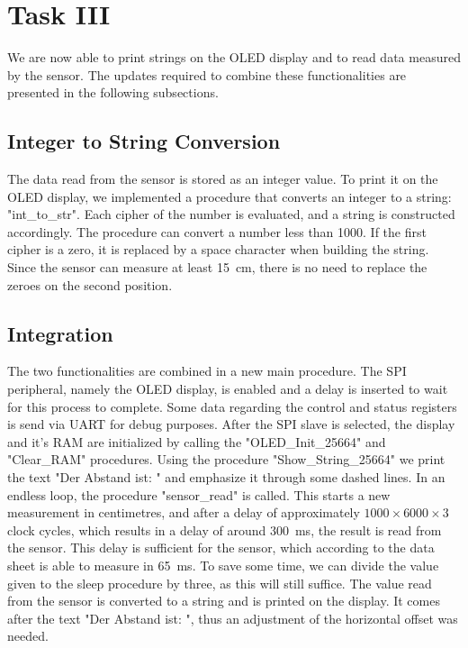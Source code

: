 	\section{Task III} %
	\label{sec:impl_task_3}
		We are now able to print strings on the OLED display and to read data measured by the sensor. The updates required to combine these functionalities are presented in the following subsections.
		
		\subsection{Integer to String Conversion} %
		\label{sub:integer_to_string_conversion}
			The data read from the sensor is stored as an integer value. To print it on the OLED display, we implemented a procedure that converts an integer to a string: "int\_to\_str". Each cipher of the number is evaluated, and a string is constructed accordingly. The procedure can convert a number less than 1000. If the first cipher is a zero, it is replaced by a space character when building the string. Since the sensor can measure at least \SI{15}{\centi\meter}, there is no need to replace the zeroes on the second position.  

		\subsection{Integration} %
		\label{sub:integration}
			The two functionalities are combined in a new main procedure. The SPI peripheral, namely the OLED display, is enabled and a delay is inserted to wait for this process to complete. Some data regarding the control and status registers is send via UART for debug purposes. After the SPI slave is selected, the display and it’s RAM are initialized by calling the "OLED\_Init\_25664" and "Clear\_RAM" procedures. Using the procedure "Show\_String\_25664" we print the text "Der Abstand ist: " and emphasize it through some dashed lines. 
			In an endless loop, the procedure "sensor\_read" is called. This starts a new measurement in centimetres, and after a delay of approximately 
			\begin{math} 
				1000 \times 6000 \times 3 
			\end{math} 
			clock cycles, which results in a delay of around \SI{300}{\milli\second}, the result is read from the sensor. This delay is sufficient for the sensor, which according to the data sheet is able to measure in \SI{65}{\milli\second}. To save some time, we can divide the value given to the sleep procedure by three, as this will still suffice. The value read from the sensor is converted to a string and is printed on the display. It comes after the text "Der Abstand ist: ", thus an adjustment of the horizontal offset was needed.

